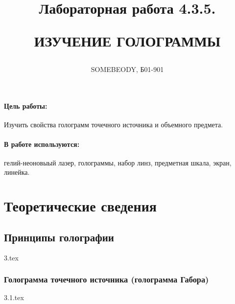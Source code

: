 \documentclass[a5paper,10pt, twoside]{article} %
\title
{
\hfill \break	\hfill \break
\hfill \break	\hfill \break
Лабораторная работа 4.3.5.

ИЗУЧЕНИЕ ГОЛОГРАММЫ
}
\author{SOMEBEODY, Б01-901}
\begin{document}
\maketitle


\thispagestyle{empty} %

\newpage

\tableofcontents %

\newpage


\paragraph{Цель работы:}

Изучить свойства голограмм точечного источника и объемного предмета.

\paragraph{В работе используются:}

гелий-неоновыый лазер, голограммы, набор линз, предметная шкала, экран, линейка.

\section{Теоретические сведения}

  \subsection{Принципы голографии}
  {3.tex}

    \subsubsection{Голограмма точечного источника (голограмма Габора)}
    {3.1.tex}
\end{document}
